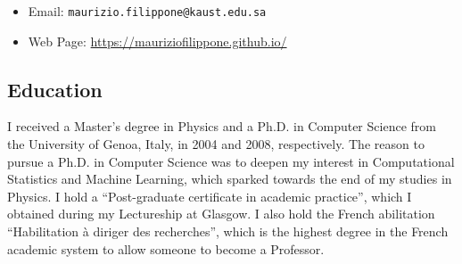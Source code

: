 \documentclass[oneside, a4paper, onecolumn, 10pt]{article}
\title{\mytitle}
\author{Maurizio Filippone} %
\newcommand{\mytitle}[0]{CURRICULUM VITAE}
\begin{document}
\begin{center}
  {\Large {\color{MidnightBlue}{\bf \mytitle}}\par}
\end{center}

\begin{center}
  {{\color{MidnightBlue}{\bf Maurizio Filippone}}\par}
\end{center}


\linespread{1.0}
\selectfont

\begin{itemize}
\item Email:              \texttt{maurizio.filippone@kaust.edu.sa}
\item Web Page:           \url{https://mauriziofilippone.github.io/}
\end{itemize}



\subsection*{Education}

I received a Master's degree in Physics and a Ph.D. in Computer Science from the University of Genoa, Italy, in 2004 and 2008, respectively.
The reason to pursue a Ph.D. in Computer Science was to deepen my interest in Computational Statistics and Machine Learning, which sparked towards the end of my studies in Physics.
I hold a ``Post-graduate certificate in academic practice'', which I obtained during my Lectureship at Glasgow.
I also hold the French abilitation ``Habilitation \`a diriger des recherches'', which is the highest degree in the French academic system to allow someone to become a Professor.


\end{document}
